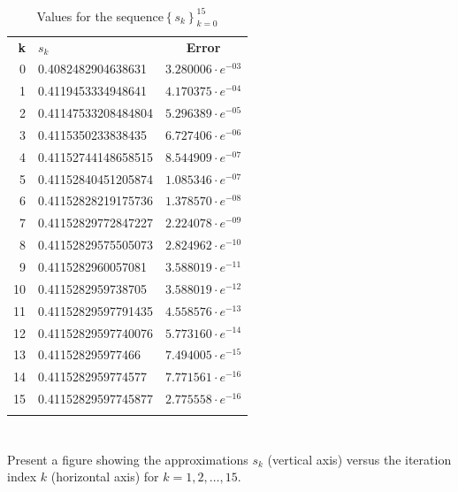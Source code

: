 \documentclass{article}
\begin{document}
\begin{table}[H]
    \centering
    \begin{tabular}{|r|l|c|}
        \Xhline{1 pt}
         \centering \textbf{k}& \textbf{$s_k$}& \textbf{Error}  \\
         \Xhline{1.5 pt}
         0 & 0.4082482904638631&$3.280006\cdot e^{-03}$\\
         \Xhline{1 pt}
         1 & 0.4119453334948641&$4.170375\cdot e^{-04}$\\
         \Xhline{1 pt}
         2 & 0.41147533208484804&$5.296389\cdot e^{-05}$\\
         \Xhline{1 pt}
         3 & 0.4115350233838435&$6.727406\cdot e^{-06}$\\
         \Xhline{1 pt}
         4 & 0.41152744148658515 &$8.544909\cdot e^{-07}$\\
         \Xhline{1 pt}
         5 & 0.41152840451205874 & $1.085346\cdot e^{-07}$\\
          \Xhline{1 pt}
         6 & 0.41152828219175736 & $1.378570\cdot e^{-08}$\\
          \Xhline{1 pt}
         7 & 0.41152829772847227 &$2.224078\cdot e^{-09}$\\
          \Xhline{1 pt}
         8 & 0.41152829575505073 &$2.824962\cdot e^{-10}$\\
          \Xhline{1 pt}
         9 & 0.4115282960057081 &$3.588019\cdot e^{-11}$\\
          \Xhline{1 pt}
         10 & 0.4115282959738705 &$3.588019\cdot e^{-12}$\\
          \Xhline{1 pt}
         11 & 0.41152829597791435 &$4.558576\cdot e^{-13}$\\
          \Xhline{1 pt}
         12 & 0.41152829597740076 &$5.773160\cdot e^{-14}$\\
          \Xhline{1 pt}
         13 & 0.411528295977466 &$7.494005\cdot e^{-15}$\\
          \Xhline{1 pt}
         14 & 0.4115282959774577&$7.771561\cdot e^{-16}$\\
          \Xhline{1 pt}
         15 & 0.41152829597745877&$2.775558\cdot e^{-16}$\\
         \Xhline{1 pt}
    \end{tabular}
    \caption{Values for the sequence$\left\{ s_k\right\}_{k=0}^{15}$}
    \label{tab:15sequence}
\end{table}

\section{}
Present a figure showing the approximations $s_k$ (vertical axis) versus the iteration index $k$ (horizontal axis) for $k=1,2,\dots,15$.
\vspace{10mm}
\end{document}
